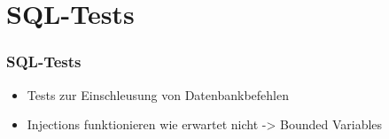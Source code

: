 \section*{SQL-Tests}

\begin{frame}\frametitle{SQL-Tests}
    \begin{itemize} 
        \item Tests zur Einschleusung von Datenbankbefehlen
        \item Injections funktionieren wie erwartet nicht -> Bounded Variables
    \end{itemize}
        
\end{frame}
